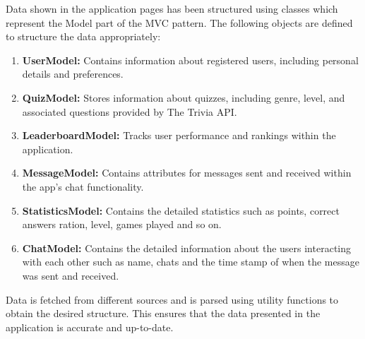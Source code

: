 Data shown in the application pages has been structured using classes which represent the Model part of the MVC pattern. The following objects are defined to structure the data appropriately:
\begin{enumerate}
\item \textbf{UserModel:} Contains information about registered users, including personal details and preferences.
\item \textbf{QuizModel:} Stores information about quizzes, including genre, level, and associated questions provided by The Trivia API.
\item \textbf{LeaderboardModel:} Tracks user performance and rankings within the application.
\item \textbf{MessageModel:} Contains attributes for messages sent and received within the app’s chat functionality.
\item \textbf{StatisticsModel:} Contains the detailed statistics such as points, correct answers ration, level, games played and so on.
\item \textbf{ChatModel:} Contains the detailed information about the users interacting with each other such as name, chats and the time stamp of when the message was sent and received.

\end{enumerate}

Data is fetched from different sources and is parsed using utility functions to obtain the desired structure. This ensures that the data presented in the application is accurate and up-to-date.